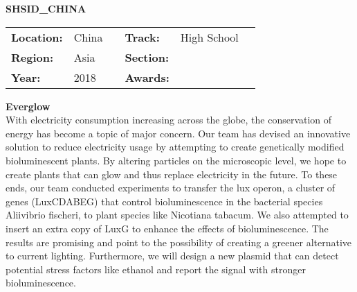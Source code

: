\textbf{\uppercase{SHSID\_China}}
\FloatBarrier
\begin{table}[h]
\begin{tabular}{lp{2.5cm}llll}
\textbf{Location:} & China & \multicolumn{1}{|l}{} & \textbf{Track:}   & High School \\
\textbf{Region:}   & Asia   & \multicolumn{1}{|l}{} & \textbf{Section:} &  \\
\textbf{Year:}     & 2018   & \multicolumn{1}{|l}{} & \textbf{Awards:}  &
\end{tabular}
\end{table}
\FloatBarrier
\noindent	\textbf{Everglow} \vspace{.2cm}\\
With electricity consumption increasing across the globe, the conservation of energy has become a topic of major concern. Our team has devised an innovative solution to reduce electricity usage by attempting to create genetically modified bioluminescent plants. By altering particles on the microscopic level, we hope to create plants that can glow and thus replace electricity in the future. To these ends, our team conducted experiments to transfer the lux operon, a cluster of genes (LuxCDABEG) that control bioluminescence in the bacterial species Aliivibrio fischeri, to plant species like Nicotiana tabacum. We also attempted to insert an extra copy of LuxG to enhance the effects of bioluminescence. The results are promising and point to the possibility of creating a greener alternative to current lighting. Furthermore, we will design a new plasmid that can detect potential stress factors like ethanol and report the signal with stronger bioluminescence.
\vspace{2cm} $ $
\pagebreak

